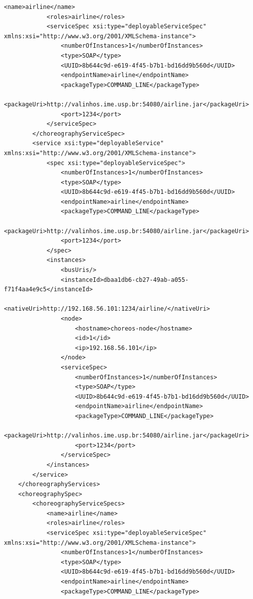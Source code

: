 \documentclass[a4paper, 10pt]{article}
\begin{document}
{\begin{lstlisting}[caption=Choreography XML representation example, label=lst:chor_xml]
            <name>airline</name>
            <roles>airline</roles>
            <serviceSpec xsi:type="deployableServiceSpec" 
xmlns:xsi="http://www.w3.org/2001/XMLSchema-instance">
                <numberOfInstances>1</numberOfInstances>
                <type>SOAP</type>
                <UUID>8b644c9d-e619-4f45-b7b1-bd16dd9b560d</UUID>
                <endpointName>airline</endpointName>
                <packageType>COMMAND_LINE</packageType>
                <packageUri>http://valinhos.ime.usp.br:54080/airline.jar</packageUri>
                <port>1234</port>
            </serviceSpec>
        </choreographyServiceSpec>
        <service xsi:type="deployableService" 
xmlns:xsi="http://www.w3.org/2001/XMLSchema-instance">
            <spec xsi:type="deployableServiceSpec">
                <numberOfInstances>1</numberOfInstances>
                <type>SOAP</type>
                <UUID>8b644c9d-e619-4f45-b7b1-bd16dd9b560d</UUID>
                <endpointName>airline</endpointName>
                <packageType>COMMAND_LINE</packageType>
                <packageUri>http://valinhos.ime.usp.br:54080/airline.jar</packageUri>
                <port>1234</port>
            </spec>
            <instances>
                <busUris/>
                <instanceId>dbaa1db6-cb27-49ab-a055-f71f4aa4e9c5</instanceId>
                <nativeUri>http://192.168.56.101:1234/airline/</nativeUri>
                <node>
                    <hostname>choreos-node</hostname>
                    <id>1</id>
                    <ip>192.168.56.101</ip>
                </node>
                <serviceSpec>
                    <numberOfInstances>1</numberOfInstances>
                    <type>SOAP</type>
                    <UUID>8b644c9d-e619-4f45-b7b1-bd16dd9b560d</UUID>
                    <endpointName>airline</endpointName>
                    <packageType>COMMAND_LINE</packageType>
                    <packageUri>http://valinhos.ime.usp.br:54080/airline.jar</packageUri>
                    <port>1234</port>
                </serviceSpec>
            </instances>
        </service>
    </choreographyServices>
    <choreographySpec>
        <choreographyServiceSpecs>
            <name>airline</name>
            <roles>airline</roles>
            <serviceSpec xsi:type="deployableServiceSpec" 
xmlns:xsi="http://www.w3.org/2001/XMLSchema-instance">
                <numberOfInstances>1</numberOfInstances>
                <type>SOAP</type>
                <UUID>8b644c9d-e619-4f45-b7b1-bd16dd9b560d</UUID>
                <endpointName>airline</endpointName>
                <packageType>COMMAND_LINE</packageType>

\end{lstlisting}}
\end{document}
